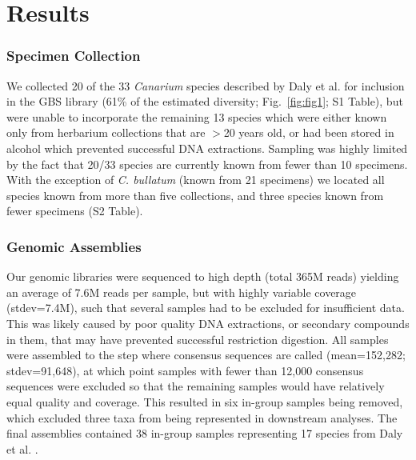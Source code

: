\documentclass[10pt,letterpaper]{article}
\begin{document}
\section*{Results}
\subsubsection*{Specimen Collection}
We collected 20 of the 33 \emph{Canarium} species described by Daly et al. \cite{daly_revision_2015} for inclusion in the GBS library (61\% of the estimated diversity; Fig.~\ref{fig:fig1}; S1 Table), %
but were unable to incorporate the remaining 13 species which were either known only from herbarium collections that are $>$20 years old, or had been stored in alcohol which prevented successful DNA extractions. Sampling was highly limited by the fact that 20/33 species are currently known from fewer than 10 specimens. With the exception of \emph{C. bullatum} (known from 21 specimens) we located all species known from more than five collections, and three species known from fewer specimens (S2 Table). %

\subsubsection*{Genomic Assemblies}
Our genomic libraries were sequenced to high depth (total 365M reads) yielding an average of 7.6M reads per sample, but with highly variable coverage (stdev=7.4M), such that several samples had to be excluded for insufficient data. This was likely caused by poor quality DNA extractions, or secondary compounds in them, that may have prevented successful restriction digestion. All samples were assembled to the step where consensus sequences are called (mean=152,282; stdev=91,648), at which point samples with fewer than 12,000 consensus sequences were excluded so that the remaining samples would have relatively equal quality and coverage. This resulted in six in-group samples being removed, which excluded three taxa from being represented in downstream analyses. The final assemblies contained 38 in-group samples representing 17 species from Daly et al. \cite{daly_revision_2015}.
\end{document}
